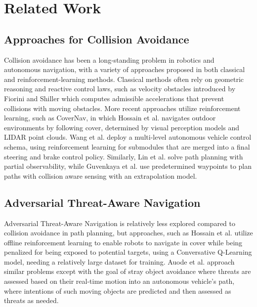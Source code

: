 \documentclass[letterpaper, 10 pt, conference]{ieeeconf}
\begin{document}
\section{Related Work}

\subsection{Approaches for Collision Avoidance}

Collision avoidance has been a long-standing problem in robotics and autonomous navigation, with a variety of approaches proposed in both classical and reinforcement-learning methods. Classical methods often rely on geometric reasoning and reactive control laws, such as velocity obstacles introduced by Fiorini and Shiller \cite{doi:10.1177/027836499801700706} which computes admissible accelerations that prevent collisions with moving obstacles. More recent approaches utilize reinforcement learning, such as CoverNav, in which Hossain et al. \cite{hossain2023covernav} navigates outdoor environments by following cover, determined by visual perception models and LIDAR point clouds. Wang et al. \cite{9461231} deploy a multi-level autonomous vehicle control schema, using reinforcement learning for submodules that are merged into a final steering and brake control policy. Similarly, Lin et al. \cite{lin2023occlusion} solve path planning with partial observability, while Guvenkaya et al. \cite{guvenkaya2024local} use predetermined waypoints to plan paths with collision aware sensing with an extrapolation model.

\subsection{Adversarial Threat-Aware Navigation}

Adversarial Threat-Aware Navigation is relatively less explored compared to collision avoidance in path planning, but approaches, such as Hossain et al. \cite{hossain2024encomp} utilize offline reinforcement learning to enable robots to navigate in cover while being penalized for being exposed to potential targets, using a Conversative Q-Learning model, needing a relatively large dataset for training. Auode et al. \cite{5650734} approach similar problems except with the goal of stray object avoidance where threats are assessed based on their real-time motion into an autonomous vehicle’s path, where intentions of such moving objects are predicted and then assessed as threats as needed.
\end{document}
